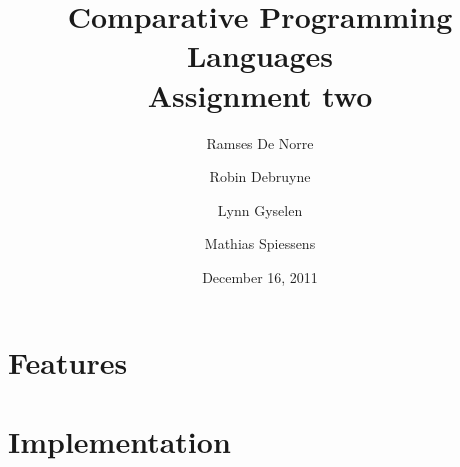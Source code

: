 \documentclass[11pt,pdftex,oneside]{article}
\title{Comparative Programming Languages\\ {\Large Assignment two}}
\author{Ramses De Norre \and Robin Debruyne
        \and Lynn Gyselen \and Mathias Spiessens}
\date{December 16, 2011}
\begin{document}
\maketitle
\thispagestyle{empty}

\section{Features}

\section{Implementation}
\end{document}
